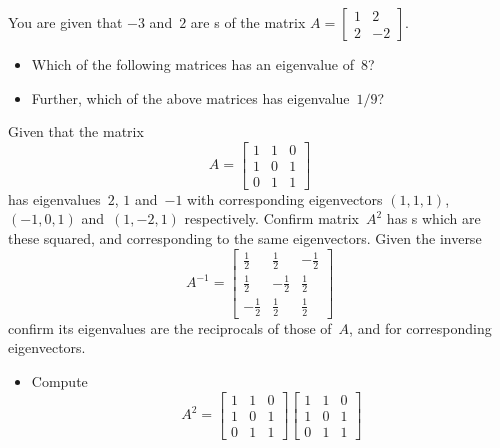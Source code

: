 \begin{activity}
You are given that \(-3\) and~\(2\) are s of the matrix \(A=\begin{bmatrix} 1&2\\2&-2 \end{bmatrix}\).
\begin{itemize}
\item Which of the following matrices has an eigenvalue of~\(8\)?
\item Further, which of the above matrices has eigenvalue~\(1/9\)?
\end{itemize}
\end{activity}






\begin{example} \label{eg:3x3sympow}
Given that the matrix 
\begin{equation*}
A=\begin{bmatrix} 1&1&0\\1&0&1\\0&1&1 \end{bmatrix}
\end{equation*}
has eigenvalues~\(2\), \(1\) and~\(-1\) with corresponding eigenvectors \((1,1,1)\), \((-1,0,1)\) and~\((1,-2,1)\) respectively.
Confirm matrix~\(A^2\) has s which are these squared, and corresponding to the same eigenvectors.
Given the inverse
\begin{equation*}
A^{-1}=\begin{bmatrix} \tfrac12&\tfrac12&-\tfrac12
\\\tfrac12&-\tfrac12&\tfrac12
\\-\tfrac12&\tfrac12&\tfrac12 \end{bmatrix}
\end{equation*}
confirm its eigenvalues are the reciprocals of those of~\(A\), and for corresponding eigenvectors.
\begin{solution} 
\begin{itemize}
\item Compute
\begin{equation*}
A^2=\begin{bmatrix} 1&1&0\\1&0&1\\0&1&1 \end{bmatrix}
\begin{bmatrix} 1&1&0\\1&0&1\\0&1&1 \end{bmatrix}

\end{equation*}
\end{itemize}
\end{solution}
\end{example}
